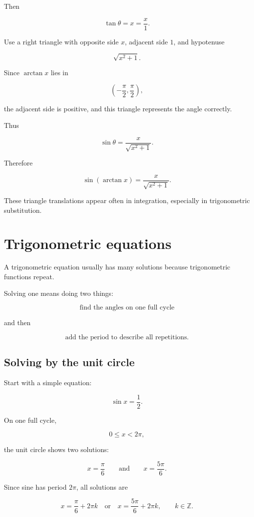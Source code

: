 Then

\[
\tan\theta=x=\frac{x}{1}.
\]

Use a right triangle with opposite side \(x\), adjacent side \(1\), and hypotenuse

\[
\sqrt{x^2+1}.
\]

Since \(\arctan x\) lies in

\[
\left(-\frac{\pi}{2},\frac{\pi}{2}\right),
\]

the adjacent side is positive, and this triangle represents the angle correctly.

Thus

\[
\sin\theta=\frac{x}{\sqrt{x^2+1}}.
\]

Therefore

\[
\boxed{
\sin(\arctan x)=\frac{x}{\sqrt{x^2+1}}.
}
\]

These triangle translations appear often in integration, especially in trigonometric
substitution.

\section{Trigonometric equations}
\label{appsec:trigonometric-equations}

A trigonometric equation usually has many solutions because trigonometric functions
repeat.

Solving one means doing two things:

\[
\text{find the angles on one full cycle}
\]

and then

\[
\text{add the period to describe all repetitions.}
\]

\subsection{Solving by the unit circle}
\label{appsubsec:solving-by-unit-circle}

Start with a simple equation:

\[
\sin x=\frac12.
\]

On one full cycle,

\[
0\le x<2\pi,
\]

the unit circle shows two solutions:

\[
x=\frac{\pi}{6}
\qquad\text{and}\qquad
x=\frac{5\pi}{6}.
\]

Since sine has period \(2\pi\), all solutions are

\[
\boxed{
x=\frac{\pi}{6}+2\pi k
\quad\text{or}\quad
x=\frac{5\pi}{6}+2\pi k,
\qquad k\in\mathbb Z.
}
\]


